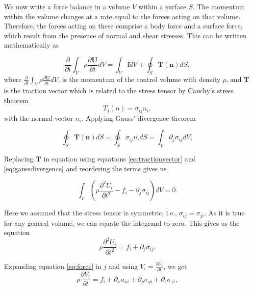 We now write a force balance in a volume $V$ within a surface $S$. The momentum within the volume changes at a rate equal
to the forces acting on that volume. Therefore, the forces acting on these comprise a body force and a surface force, which result
from the presence of normal and shear stresses. This can be written mathematically as 

\begin{equation}
    \frac{\partial}{\partial t} \int_V \rho \frac{\partial \mathbf{U}}{\partial t}dV = \int_V \mathbf{f}dV + \oint_S \mathbf{T\left(n\right)}dS,
    \label{eq:forcebalance}
\end{equation}
where $\frac{\partial}{\partial t} \int_V \rho \frac{\partial \mathbf{U}}{\partial t}dV$, is the momentum of the control volume with density $\rho$, and $\mathbf{T}$
is the traction vector which is related to the stress tensor by Cauchy's stress theorem %
\begin{equation}
    T_j\left(n\right) = \sigma_{ij}n_i,
    \label{eq:tractionvector}
\end{equation}
with the normal vector $n_i$. Applying Gauss' divergence theorem

\begin{equation}
    \oint_S \mathbf{T\left(n\right)}dS = \oint_S \sigma_{ij}n_idS = \int_V \partial_j \sigma_{ij}dV,
\label{eq:gaussdivergence}
\end{equation}

Replacing $\mathbf{T}$ in equation  using equations \ref{eq:tractionvector} and \ref{eq:gaussdivergence} and reordering the terms gives us

\begin{equation}
    \int_V \left(\rho \frac{\partial^2 {U}_i}{\partial t^2} - f_i - \partial_j \sigma_{ij}\right)dV = 0.
\end{equation}

Here we assumed that the stress tensor is symmetric, i.e., $\sigma_{ij}=\sigma_{ji}$. As it is true for any general volume, we can
equate the integrand to zero. This gives us the equation
\begin{equation}
    \rho \frac{\partial^2 {U}_i}{\partial t^2} = f_i + \partial_j \sigma_{ij}.
    \label{eq:force}
\end{equation}

Expanding equation \ref{eq:force} in $j$ and using $V_i = \frac{\partial U_i}{\partial t}$, we get
\begin{equation}
    \rho \frac{\partial V_i}{\partial t} = f_i + \partial_x \sigma_{xi} + \partial_y \sigma_{yi} + \partial_z \sigma_{zi},
    \label{eq:finalequation}
\end{equation}

